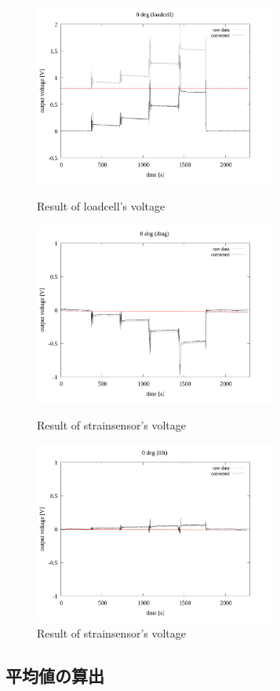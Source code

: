 \documentclass[twocolumn,a4j]{jsarticle}
\begin{document}
\begin{figure}[htbp]
    \footnotesize
    \begin{center}
        \includegraphics[width=80mm]{../images/0_loadcell_drift.png}
        \caption{Result of loadcell's voltage}
        \includegraphics[width=80mm]{../images/0_drag_drift.png}
        \caption{Result of strainsensor's voltage}
        \includegraphics[width=80mm]{../images/0_lift_drift.png}
        \caption{Result of strainsensor's voltage}
    \end{center}
\end{figure}

\subsection{平均値の算出}
\end{document}
